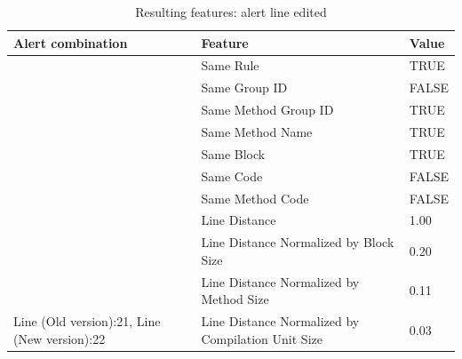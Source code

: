 \documentclass[
]{article}
\begin{document}
\begin{table}[!h]

\caption{\label{tab:unnamed-chunk-14}Resulting features: alert line edited \label{editing_line} }
\centering
\begin{tabular}[t]{l|l|l}
\hline
Alert combination & Feature & Value\\
\hline
\rowcolor{gray!6}   & Same Rule & TRUE\\

 & Same Group ID & FALSE\\

\rowcolor{gray!6}   & Same Method Group ID & TRUE\\

 & Same Method Name & TRUE\\

\rowcolor{gray!6}   & Same Block & TRUE\\

 & Same Code & FALSE\\

\rowcolor{gray!6}   & Same Method Code & FALSE\\

 & Line Distance & 1.00\\

\rowcolor{gray!6}   & Line Distance Normalized by Block Size & 0.20\\

 & Line Distance Normalized by Method Size & 0.11\\

\multirow[t]{-11}{*}{\raggedright\arraybackslash Line (Old version):21, Line (New version):22} & Line Distance Normalized by Compilation Unit Size & 0.03\\
\hline
\end{tabular}
\end{table}

\normalsize

\newpage
\end{document}
